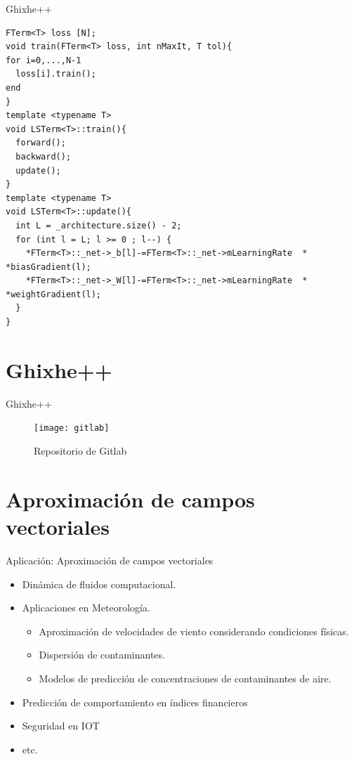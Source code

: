 \documentclass[aspectratio=1610]{beamer}
\begin{document}
\begin{frame}[fragile]{Ghixhe++}
\begin{small}
\begin{verbatim}
FTerm<T> loss [N];
void train(FTerm<T> loss, int nMaxIt, T tol){
for i=0,...,N-1
  loss[i].train();
end
}
template <typename T>
void LSTerm<T>::train(){
  forward();
  backward();
  update();
}
template <typename T>
void LSTerm<T>::update(){
  int L = _architecture.size() - 2;
  for (int l = L; l >= 0 ; l--) {
    *FTerm<T>::_net->_b[l]-=FTerm<T>::_net->mLearningRate  * *biasGradient(l);
    *FTerm<T>::_net->_W[l]-=FTerm<T>::_net->mLearningRate  * *weightGradient(l);
  }
}
\end{verbatim}
\end{small}
\end{frame}




\section{Ghixhe++}
\label{sec:i}

\begin{frame}{Ghixhe++}
    \begin{figure}[h]
    \centering
    \texttt{[image: gitlab]}
    \caption{ Repositorio de Gitlab }
  \end{figure}

\end{frame}



\section{Aproximaci\'on de campos vectoriales }
\begin{frame}{Aplicaci\'on: Aproximaci\'on de campos vectoriales }
 
  \begin{itemize}
  \item Dinámica de fluidos computacional.
  \item Aplicaciones en Meteorología.
    \begin{itemize}
    \item Aproximaci\'on de velocidades de viento considerando condiciones f\'isicas.    
    \item Dispersi\'on de contaminantes.
    \item Modelos de predicci\'on de concentraciones de contaminantes de aire.  
    \end{itemize}
  \item Predicción de comportamiento en índices financieros 
  \item Seguridad en IOT
  \item etc.
  \end{itemize}

\end{frame}
\end{document}
